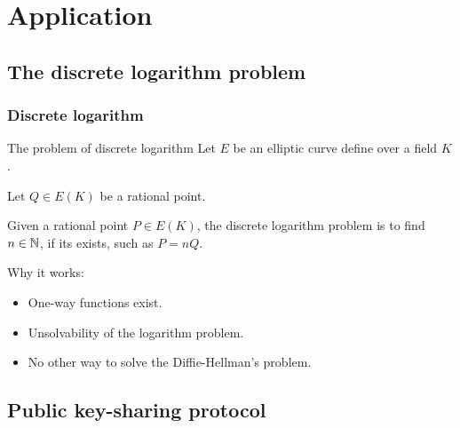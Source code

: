 \section{Application}

\subsection{The discrete logarithm problem} 

\begin{frame}[t]
    \frametitle{Discrete logarithm}
    \begin{alertblock}{The problem of discrete logarithm}
        Let $E$ be an elliptic curve define over a field $K$.

        Let $Q \in E(K)$ be a rational point.

        Given a rational point $P \in E(K)$, the discrete logarithm problem is to find $n \in
        \mathbb{N} $, if its exists, such as $P = nQ$.
    \end{alertblock}

    Why it works:
    \begin{itemize}
        \item One-way functions exist.
        \item Unsolvability of the logarithm problem.
        \item No other way to solve the Diffie-Hellman's problem.
    \end{itemize}
\end{frame}

\subsection{Public key-sharing protocol}

